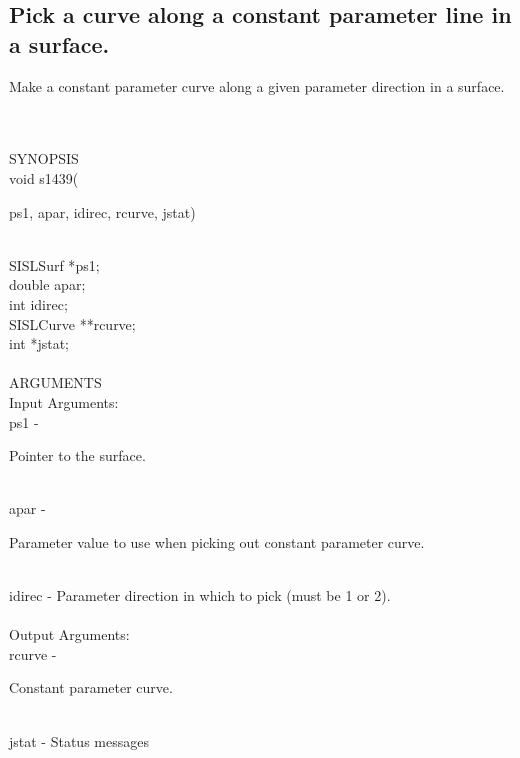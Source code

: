 \subsection{Pick a curve along a constant parameter line in a surface.}
\begin{minipg1}
  Make a constant parameter curve along a given parameter direction in a surface.
\end{minipg1} \\ \\
SYNOPSIS\\
        \>void s1439(\begin{minipg3}
          {\fov ps1}, {\fov apar}, {\fov idirec}, {\fov rcurve}, {\fov jstat})
        \end{minipg3}\\[0.3ex]
        \>\>    SISLSurf \> *{\fov ps1};\\
        \>\>    double   \> {\fov apar};\\
        \>\>    int      \> {\fov idirec};\\
        \>\>    SISLCurve \> **{\fov rcurve};\\
        \>\>    int      \> *{\fov jstat};\\
\\
ARGUMENTS\\
        \>Input Arguments:\\
        \>\>    {\fov ps1}\> - \>  \begin{minipg2}
                     Pointer to the surface.
                               \end{minipg2}\\
        \>\>    {\fov apar}\> - \>  \begin{minipg2}
                     Parameter value to use when picking out constant
                       parameter curve.
                               \end{minipg2}\\[0.8ex]
        \>\>    {\fov idirec}\> - \>
                     Parameter direction in which to pick (must be 1 or 2).\\
\\
        \>Output Arguments:\\
        \>\>    {\fov rcurve}\> - \>  \begin{minipg2}
                     Constant parameter curve.
                               \end{minipg2}\\
        \>\>    {\fov jstat} \> - \> Status messages\\
